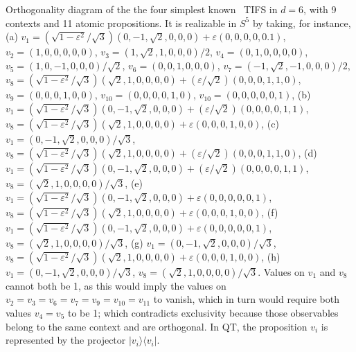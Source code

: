 \documentclass[%
  twocolumn,
 showpacs,
 showkeys,
 preprintnumbers,
 amsmath,amssymb,
 aps,
  pra,
  longbibliography,
 floatfix,
 ]{revtex4-1}
\begin{document}
Orthogonality diagram of the  the four  simplest known~\cite{}
TIFS  in $d=6$, with 9 contexts and 11 atomic propositions.
It is realizable in  $S^5$ by taking,
for instance,
(a)
$v_1     =  (\sqrt{1-\varepsilon^2} / \sqrt{3})(  {0,-1,\sqrt{2},0,0,0}  )+\varepsilon({0,0,0,0,0.1})$,
$v_2     = (  {1,0,0,0,0,0}    )$,
$v_3     = (  {1,\sqrt{2},1,0,0,0}   )/ 2 $,
$v_4     = (  {0,1,0,0,0,0}    ) $,
$v_5     = (  {1,0,-1,0,0,0}     )/\sqrt{2}$,
$v_6     = (  {0,0,1,0,0,0}     ) $,
$v_7   = (     {-1,\sqrt{2},-1,0,0,0} )/ 2$,
$v_8   =      (\sqrt{1-\varepsilon^2} / \sqrt{3})  ({\sqrt{2},1,0,0,0,0})+(\varepsilon/\sqrt{2})({0,0,0,1,1,0})$,
$v_9     = (   {0,0,0,1,0,0} )$,
$v_{10}     = (   {0,0,0,0,1,0} )$,
$v_{10}     = (   {0,0,0,0,0,1} )$,
(b)
$v_1   =  (\sqrt{1-\varepsilon^2} / \sqrt{3})  ({0,-1,\sqrt{2},0,0,0})+(\varepsilon/\sqrt{2})({0,0,0,0,1,1})$,
$v_8   =  (\sqrt{1-\varepsilon^2} / \sqrt{3})  ( {\sqrt{2},1,0,0,0,0})+\varepsilon({0,0,0,1,0,0})$,
(c)
$v_1   = ({0,-1,\sqrt{2},0,0,0})/ \sqrt{3}$,
$v_8   =  (\sqrt{1-\varepsilon^2} / \sqrt{3})  ( {\sqrt{2},1,0,0,0,0})+(\varepsilon/\sqrt{2})({0,0,0,1,1,0})$,
(d)
$v_1   =  (\sqrt{1-\varepsilon^2} / \sqrt{3})  ({0,-1,\sqrt{2},0,0,0})+(\varepsilon/\sqrt{2})({0,0,0,0,1,1})$,
$v_8   =  ( {\sqrt{2},1,0,0,0,0})/ \sqrt{3}$,
(e)
$v_1   =  (\sqrt{1-\varepsilon^2} / \sqrt{3})  ({0,-1,\sqrt{2},0,0,0})+\varepsilon({0,0,0,0,0,1})$,
$v_8   =  (\sqrt{1-\varepsilon^2} / \sqrt{3})  ( {\sqrt{2},1,0,0,0,0})+\varepsilon({0,0,0,1,0,0})$,
(f)
$v_1   =  (\sqrt{1-\varepsilon^2} / \sqrt{3})  ({0,-1,\sqrt{2},0,0,0})+\varepsilon({0,0,0,0,0,1})$,
$v_8   =  ( {\sqrt{2},1,0,0,0,0})/ \sqrt{3}$,
(g)
$v_1   = ({0,-1,\sqrt{2},0,0,0})/ \sqrt{3}$,
$v_8   =  (\sqrt{1-\varepsilon^2} / \sqrt{3})  ( {\sqrt{2},1,0,0,0,0})+\varepsilon({0,0,0,1,0,0})$,
(h)
$v_1   = ({0,-1,\sqrt{2},0,0,0})/ \sqrt{3}$,
$v_8   =  ( {\sqrt{2},1,0,0,0,0})/ \sqrt{3}$.
Values on $v_1$ and $v_8$ cannot both be 1, as this would imply the values on $v_2=v_3=v_6=v_7=v_9=v_{10}=v_{11}$ to vanish,
which in turn would require both values $v_4=v_5$ to be 1; which contradicts exclusivity
because those observables belong to the same context and are orthogonal.
In QT, the proposition $v_i$ is represented by the projector $| v_i \rangle\langle v_i |$.
\end{document}
